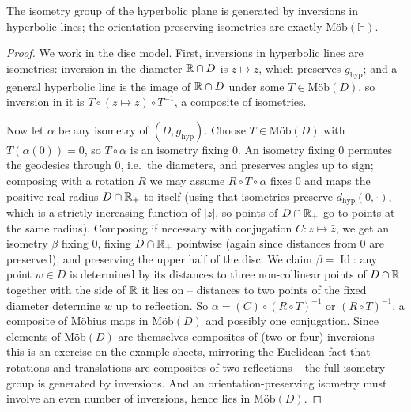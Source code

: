 \documentclass[a4paper]{scrartcl}
\newcommand{\Mob}{\text{M\"ob}}
\newcommand{\HH}{\mathbb{H}}
\begin{document}
\begin{theorem}
    The isometry group of the hyperbolic plane is generated by inversions in hyperbolic lines; the orientation-preserving isometries are exactly $\Mob(\HH)$.
\end{theorem}
\begin{proof}
    We work in the disc model. First, inversions in hyperbolic lines are isometries: inversion in the diameter $\mathbb{R} \cap D$ is $z \mapsto \bar z$, which preserves $g_{\mathrm{hyp}}$; and a general hyperbolic line is the image of $\mathbb{R} \cap D$ under some $T \in \Mob(D)$, so inversion in it is $T \circ (z \mapsto \bar z) \circ T^{-1}$, a composite of isometries.

    Now let $\alpha$ be any isometry of $(D, g_{\mathrm{hyp}})$. Choose $T \in \Mob(D)$ with $T(\alpha(0)) = 0$, so $T \circ \alpha$ is an isometry fixing $0$. An isometry fixing $0$ permutes the geodesics through $0$, i.e.\ the diameters, and preserves angles up to sign; composing with a rotation $R$ we may assume $R \circ T \circ \alpha$ fixes $0$ and maps the positive real radius $D \cap \mathbb{R}_{+}$ to itself (using that isometries preserve $d_{\mathrm{hyp}}(0, \cdot)$, which is a strictly increasing function of $|z|$, so points of $D \cap \mathbb{R}_+$ go to points at the same radius). Composing if necessary with conjugation $C: z \mapsto \bar z$, we get an isometry $\beta$ fixing $0$, fixing $D \cap \mathbb{R}_+$ pointwise (again since distances from $0$ are preserved), and preserving the upper half of the disc. We claim $\beta = \operatorname{Id}$: any point $w \in D$ is determined by its distances to three non-collinear points of $D \cap \mathbb{R}$ together with the side of $\mathbb{R}$ it lies on -- distances to two points of the fixed diameter determine $w$ up to reflection.
    So $\alpha = (C) \circ (R \circ T)^{-1}$ or $(R \circ T)^{-1}$, a composite of M\"obius maps in $\Mob(D)$ and possibly one conjugation. Since elements of $\Mob(D)$ are themselves composites of (two or four) inversions -- this is an exercise on the example sheets, mirroring the Euclidean fact that rotations and translations are composites of two reflections -- the full isometry group is generated by inversions. And an orientation-preserving isometry must involve an even number of inversions, hence lies in $\Mob(D)$.
\end{proof}
\end{document}
